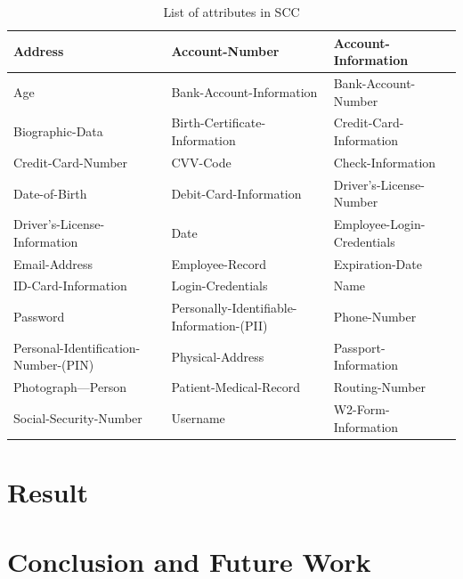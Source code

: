 \documentclass[letterpaper, 10 pt, conference]{ieeeconf}  %
\begin{document}
\begin{table}[h!]
\centering
\begin{tabu} to 0.45\textwidth { | X[l] | X[l] | X[l] | }
 \hline
    Address & Account-Number & Account-Information \\
    \hline
    Age & Bank-Account-Information & Bank-Account-Number \\
    \hline
    Biographic-Data & Birth-Certificate-Information & Credit-Card-Information \\
    \hline
    Credit-Card-Number & CVV-Code & Check-Information \\
    \hline
    Date-of-Birth & Debit-Card-Information & Driver's-License-Number \\
    \hline
    Driver's-License-Information & Date & Employee-Login-Credentials \\
    \hline
    Email-Address & Employee-Record & Expiration-Date \\
    \hline
    ID-Card-Information & Login-Credentials & Name \\
    \hline
    Password & Personally-Identifiable-Information-(PII) & Phone-Number \\
    \hline
    Personal-Identification-Number-(PIN) & Physical-Address & Passport-Information \\
    \hline
    Photograph---Person & Patient-Medical-Record & Routing-Number \\
    \hline
    Social-Security-Number & Username & W2-Form-Information \\
    \hline
\end{tabu}
\caption{List of attributes in SCC}
\label{table:1}
\end{table}

\section{Result}


\section{Conclusion and Future Work}

\addtolength{\textheight}{-12cm}   %
\end{document}
